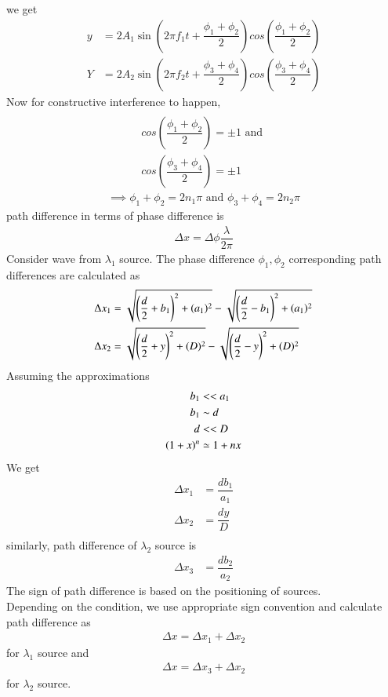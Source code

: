 \documentclass[journal,12pt,twocolumn]{IEEEtran}
\theoremstyle{remark}
\begin{document}
we get
\begin{align}
    y&=2A_1\sin(2\pi f_1t + \dfrac{\phi_1+\phi_2}{2})cos(\dfrac{\phi_1+\phi_2}{2})\\
    Y&=2A_2\sin(2\pi f_2t + \dfrac{\phi_3+\phi_4}{2})cos(\dfrac{\phi_3+\phi_4}{2})
\end{align}
Now for constructive interference to happen,
\begin{align*}
    \\cos(\dfrac{\phi_1+\phi_2}{2})=\pm1 \text{ and } \\cos(\dfrac{\phi_3+\phi_4}{2})=\pm1 
\end{align*}
\begin{align}
\implies \phi_1+\phi_2=2n_1\pi \text{ and } \phi_3+\phi_4=2n_2\pi \label{12.10.6.1}
\end{align}
path difference in terms of phase difference is
\begin{align}
    \Delta x=\Delta\phi\dfrac{\lambda}{2\pi}
\end{align}
Consider wave from $\lambda_1$ source. The phase difference $\phi_1,\phi_2$ corresponding path differences are calculated as  
\begin{align}
    \Delta x_1 &=\sqrt{\left(\dfrac{d}{2}+b_1\right)^{2}+(a_1)^{2}} - \sqrt{\left(\dfrac{d}{2}-b_1\right)^{2}+(a_1)^{2}}\\
    \Delta x_2 &=\sqrt{\left(\dfrac{d}{2}+y\right)^{2}+(D)^{2}} - \sqrt{\left(\dfrac{d}{2}-y\right)^{2}+(D)^{2}}
\end{align}
Assuming the approximations 
\begin{align}
    b_1&<<a_1\\
    b_1&\sim d\\
    d&<<D\\
    \left(1+x\right)^{n}&\simeq1+nx
\end{align}
We get
\begin{align}
    \Delta x_1 &= \dfrac{db_1}{a_1}\\
    \Delta x_2 &= \dfrac{dy}{D}\\
\end{align}
similarly, path difference of $\lambda_2$ source is
\begin{align}
    \Delta x_3 &= \dfrac{db_2}{a_2}
\end{align}
The sign of path difference is based on the positioning of sources.\\
Depending on the condition, we use appropriate sign convention and calculate path difference as
\begin{align}
    \Delta x = \Delta x_1 + \Delta x_2
\end{align}
for $\lambda_1$ source and
\begin{align}
    \Delta x = \Delta x_3 + \Delta x_2
\end{align}
for $\lambda_2$ source. \\
\end{document}
